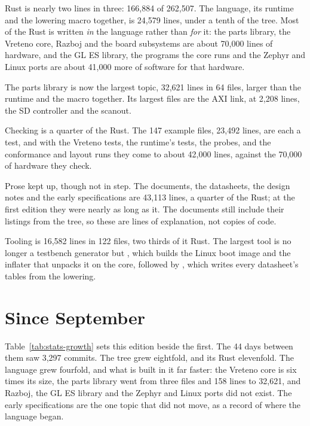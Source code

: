 \documentclass[journal,onecolumn,9pt]{IEEEtran}
\begin{document}
Rust is nearly two lines in three: 166,884 of 262,507. The language,
its runtime and the lowering macro together, is 24,579 lines, under a
tenth of the tree. Most of the Rust is written \emph{in} the language
rather than \emph{for} it: the parts library, the Vreteno core, Razboj
and the board subsystems are about 70,000 lines of hardware, and the
GL ES library, the programs the core runs and the Zephyr and Linux
ports are about 41,000 more of software for that hardware.

The parts library is now the largest topic, 32,621 lines in 64 files,
larger than the runtime and the macro together. Its largest files are
the AXI link, at 2,208 lines, the SD controller and the scanout.

Checking is a quarter of the Rust. The 147 example files, 23,492
lines, are each a test, and with the Vreteno tests, the runtime's
tests, the probes, and the conformance and layout runs they come to
about 42,000 lines, against the 70,000 of hardware they check.

Prose kept up, though not in step. The documents, the datasheets, the
design notes and the early specifications are 43,113 lines, a quarter
of the Rust; at the first edition they were nearly as long as it.
The documents still include their listings from the tree, so these are
lines of explanation, not copies of code.

Tooling is 16,582 lines in 122 files, two thirds of it Rust. The
largest tool is no longer a testbench generator but ,
which builds the Linux boot image and the inflater that unpacks it on
the core, followed by , which writes every datasheet's
tables from the lowering.

\section{Since September}
\label{sec:stats-growth}

Table~\ref{tab:stats-growth} sets this edition beside the first. The
44 days between them saw 3,297 commits. The tree grew eightfold, and
its Rust elevenfold. The language grew fourfold, and what is built in
it far faster: the Vreteno core is six times its size, the parts
library went from three files and 158 lines to 32,621, and Razboj, the
GL ES library and the Zephyr and Linux ports did not exist. The
early specifications are the one topic that did not move, as a record
of where the language began.
\end{document}

